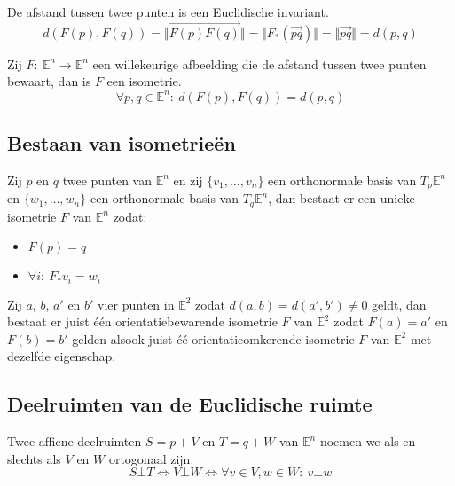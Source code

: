 \documentclass[main.tex]{subfiles}
\begin{document}
\begin{st}
  De afstand tussen twee punten is een Euclidische invariant.
\[ d(F(p),F(q)) = \Vert \overrightarrow{F(p)F(q)} \Vert = \Vert F_{*}(\overrightarrow{pq}) \Vert = \Vert \overrightarrow{pq} \Vert = d(p,q) \]
\end{st}

\begin{st}
  Zij $F:\ \mathbb{E}^{n}\rightarrow \mathbb{E}^{n}$ een willekeurige afbeelding die de afstand tussen twee punten bewaart, dan is $F$ een isometrie.
  \[ \forall p,q \in \mathbb{E}^{n}:\  d(F(p),F(q)) = d(p,q) \]
\end{st}

\subsection{Bestaan van isometrie\"en}
\label{sec:best-van-isom}

\begin{st}
  Zij $p$ en $q$ twee punten van $\mathbb{E}^{n}$ en zij $\{ v_{1},\dotsc,v_{n} \}$ een orthonormale basis van $T_{p}\mathbb{E}^{n}$ en $\{ w_{1},\dotsc,w_{n} \}$ een orthonormale basis van $T_{q}\mathbb{E}^{n}$, dan bestaat er een unieke isometrie $F$ van $\mathbb{E}^{n}$ zodat:
  \begin{itemize}
  \item $F(p) = q$
  \item $\forall i:\ F_{*}v_{i} = w_{i}$
  \end{itemize}
\end{st}

\begin{gev}
  Zij $a$, $b$, $a'$ en $b'$ vier punten in $\mathbb{E}^{2}$ zodat $d(a,b) = d(a',b') \neq 0$ geldt, dan bestaat er juist \'e\'en orientatiebewarende isometrie $F$ van $\mathbb{E}^{2}$ zodat $F(a) = a'$ en $F(b) = b'$ gelden alsook juist \'e\'e orientatieomkerende isometrie $F$ van $\mathbb{E}^{2}$ met dezelfde eigenschap.
\end{gev}

\subsection{Deelruimten van de Euclidische ruimte}
\label{sec:deelruimten-van-de}

\begin{de}
  Twee affiene deelruimten $S=p+V$ en $T=q+W$ van $\mathbb{E}^{n}$ noemen we  als en slechts als $V$ en $W$ ortogonaal zijn:
  \[ S \bot T \Leftrightarrow V \bot W \Leftrightarrow \forall v \in V, w \in W:\ v \bot w \]
\end{de}
\end{document}
